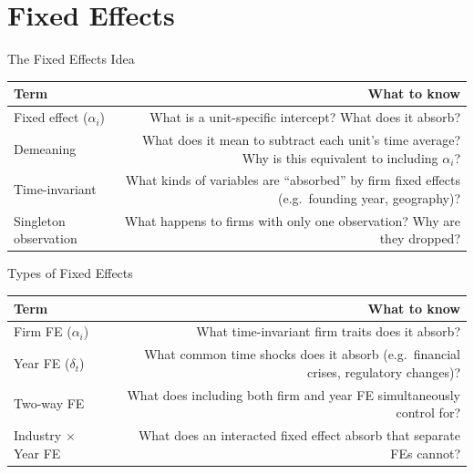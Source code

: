 \documentclass[9pt,aspectratio=169]{beamer}
\begin{document}
\section{Fixed Effects}

\begin{frame}{The Fixed Effects Idea}

\begin{tabular}{@{}lR@{}}
\toprule
\textbf{Term} & \textbf{What to know} \\
\midrule
\alert{Fixed effect ($\alpha_i$)} & What is a unit-specific intercept? What does it absorb? \\[0.8em]
\alert{Demeaning} & What does it mean to subtract each unit's time average? Why is this equivalent to including $\alpha_i$? \\[0.8em]
\alert{Time-invariant} & What kinds of variables are ``absorbed'' by firm fixed effects (e.g.\ founding year, geography)? \\[0.8em]
\alert{Singleton observation} & What happens to firms with only one observation? Why are they dropped? \\
\bottomrule
\end{tabular}

\end{frame}


\begin{frame}{Types of Fixed Effects}

\begin{tabular}{@{}lR@{}}
\toprule
\textbf{Term} & \textbf{What to know} \\
\midrule
\alert{Firm FE ($\alpha_i$)} & What time-invariant firm traits does it absorb? \\[0.8em]
\alert{Year FE ($\delta_t$)} & What common time shocks does it absorb (e.g.\ financial crises, regulatory changes)? \\[0.8em]
\alert{Two-way FE} & What does including both firm and year FE simultaneously control for? \\[0.8em]
\alert{Industry $\times$ Year FE} & What does an interacted fixed effect absorb that separate FEs cannot? \\
\bottomrule
\end{tabular}

\end{frame}
\end{document}
